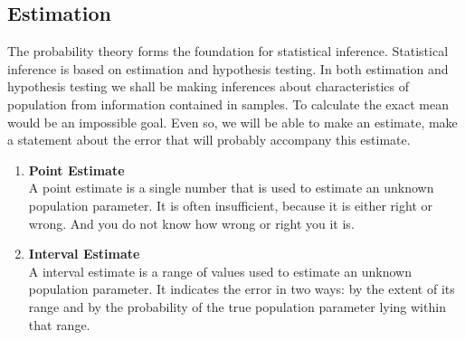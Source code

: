 \documentclass[aima331_lecturenotes_ku.tex]{subfiles}
\begin{document}
\subsection{Estimation}
The probability theory forms the foundation for statistical inference. Statistical inference is based on estimation and hypothesis testing. In both estimation and hypothesis testing we shall be making inferences about characteristics of population from information contained in samples. To calculate the exact mean would be an impossible goal. Even so, we will be able to make an estimate, make a statement about the error that will probably accompany this estimate.
\begin{enumerate}
\item \textbf{Point Estimate} \\[1mm]
  A point estimate is a single number that is used to estimate an unknown population parameter. It is often insufficient, because it is either right or wrong. And you do not know how wrong or right you it is.

\item \textbf{Interval Estimate} \\[1mm]
  A interval estimate is a range of values used to estimate an unknown population parameter. It indicates the error in two ways: by the extent of its range and by the probability of the true population parameter lying within that range.

\end{enumerate}
\end{document}
